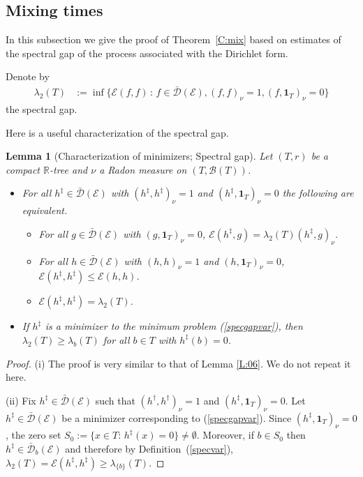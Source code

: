 \documentclass[11pt]{amsart}
\numberwithin{equation}{section}
\newtheorem{lemma}[definition]{Lemma}
\begin{document}
{\subsection{Mixing times}
\label{Sub:mix}
In this subsection we give the proof of Theorem~\ref{C:mix}
based on estimates of the spectral gap of the process associated with the Dirichlet form.

Denote by
\begin{equation}
\label{specgapvar}
\begin{aligned}
   \lambda_2(T)
 &:=
   \inf\big\{\mathcal E(f,f)\,:\,f\in\bar{\mathcal D}(\mathcal E),(f,f)_{\nu}=1,(f,\mathbf{1}_T)_{\nu}=0\big\}
\end{aligned}
\end{equation}
{{\it} the spectral gap}.

Here is a useful characterization of the spectral gap.
\begin{lemma}[Characterization of minimizers; Spectral gap]
Let $(T,r)$ be a compact ${{\mathbb R}}$-tree and $\nu$ a Radon measure  on $(T,{\mathcal B}(T))$. \label{L:12}
\begin{itemize}
\item[(i)]
For all $h^\ddagger\in\bar{\mathcal D}(\mathcal E)$ with $(h^\ddagger,h^\ddagger)_{\nu}=1$
and $(h^\ddagger,\mathbf{1}_T)_{\nu}=0$ the following are equivalent.
\begin{itemize}
\item[(a)] For all $g\in\bar{\mathcal D}(\mathcal E)$ with $(g,\mathbf{1}_T)_{\nu}=0$,
$\mathcal E(h^\ddagger,g)=\lambda_2(T)(h^\ddagger,g)_{\nu}$.
\item[(b)] For all $h\in\bar{{\mathcal D}}(\mathcal E)$ with $(h,h)_{\nu}=1$
and $(h,\mathbf{1}_T)_{\nu}=0$,
${\mathcal E}(h^\ddagger,h^\ddagger)\le{\mathcal E}(h,h)$.
\item[(c)] ${\mathcal E}(h^\ddagger,h^\ddagger)=\lambda_2(T)$.
\end{itemize}
\item[(ii)] If $h^\ddagger$ is a minimizer to the minimum problem (\ref{specgapvar}), then $\lambda_2(T)\ge\lambda_b(T)$ for all $b\in T$ with $h^\ddagger(b)=0$.
\end{itemize}
\end{lemma}{\smallskip}

\begin{proof}
(i) The proof is very similar to that of Lemma \ref{L:06}. We do not repeat it here.

(ii) Fix $h^\ddagger\in\bar{\mathcal D}({\mathcal E})$ such that $(h^\dagger,h^\dagger)_\nu=1$ and $(h^\ddagger,\mathbf{1}_T)_\nu=0$.
Let $h^\ddagger\in\bar{\mathcal D}(\mathcal E)$ be a minimizer corresponding to (\ref{specgapvar}).
Since $(h^\ddagger,\mathbf{1}_T)_\nu=0$, the zero set $S_0:=\{x\in T:\,h^\ddagger(x)=0\}\not=\emptyset$. Moreover,
if $b\in S_0$ then $h^\ddagger\in\bar{\mathcal D}_b({\mathcal E})$ and therefore by Definition~(\ref{specvar}),
$\lambda_{2}(T)={\mathcal E}(h^\ddagger,h^\ddagger)\ge\lambda_{\{b\}}(T)$.
\end{proof}{\smallskip}

}
\end{document}
